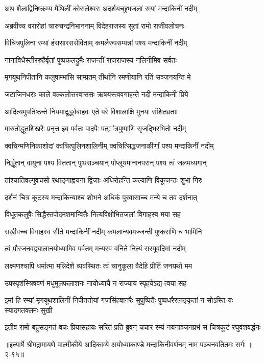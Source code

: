 
\twolineshloka
{अथ शैलाद्विनिष्क्रम्य मैथिलीं कोसलेश्वरः}
{अदर्शयच्छुभजलां रम्यां मन्दाकिनीं नदीम्} %

\twolineshloka
{अब्रवीच्च वरारोहां चारुचन्द्रनिभाननाम्}
{विदेहराजस्य सुतां रामो राजीवलोचनः} %

\twolineshloka
{विचित्रपुलिनां रम्यां हंससारससेविताम्}
{कमलैरुपसम्पन्नां पश्य मन्दाकिनीं नदीम्} %

\twolineshloka
{नानाविधैस्तीररुहैर्वृतां पुष्पफलद्रुमैः}
{राजन्तीं राजराजस्य नलिनीमिव सर्वतः} %

\twolineshloka
{मृगयूथनिपीतानि कलुषाम्भांसि साम्प्रतम्}
{तीर्थानि रमणीयानि रतिं सञ्जनयन्ति मे} %

\twolineshloka
{जटाजिनधराः काले वल्कलोत्तरवाससः}
{ऋषयस्त्ववगाहन्ते नदीं मन्दाकिनीं प्रिये} %

\twolineshloka
{आदित्यमुपतिष्ठन्ते नियमादूर्द्ध्वबाहवः}
{एते परे विशालाक्षि मुनयः संशितव्रताः} %

\twolineshloka
{मारुतोद्धूतशिखरैः प्रनृत्त इव पर्वतः}
{पादपैः पत्ऺत्रपुष्पाणि सृजद्भिरभितो नदीम्} %

\twolineshloka
{क्वचिन्मणिनिकाशोदां क्वचित्पुलिनशालिनीम्}
{क्वचित्सिद्धजनाकीर्णां पश्य मन्दाकिनीं नदीम्} %

\twolineshloka
{निर्द्धूतान् वायुना पश्य विततान् पुष्पसञ्चयान्}
{पोप्लूयमानानपरान् पश्य त्वं जलमध्यगान्} %

\twolineshloka
{तांश्चातिवल्गुवचसो रथाङ्गाह्वयना द्विजाः}
{अधिरोहन्ति कल्याणि विकूजन्तः शुभा गिरः} %

\twolineshloka
{दर्शनं चित्र कूटस्य मन्दाकिन्याश्च शोभने}
{अधिकं पुरवासाच्च मन्ये च तव दर्शनात्} %

\twolineshloka
{विधूतकलुषैः सिद्धैस्तपोदमशमान्वितैः}
{नित्यविक्षोभितजलां विगाहस्व मया सह} %

\twolineshloka
{सखीवच्च विगाहस्व सीते मन्दाकिनीं नदीम्}
{कमलान्यवमज्जन्ती पुष्कराणि च भामिनि} %

\twolineshloka
{त्वं पौरजनवद्व्यालानयोध्यामिव पर्वतम्}
{मन्यस्व वनिते नित्यं सरयूवदिमां नदीम्} %

\twolineshloka
{लक्ष्मणश्चापि धर्मात्मा मन्निदेशे व्यवस्थितः}
{त्वं चानुकूला वैदेहि प्रीतिं जनयथो मम} %

\twolineshloka
{उपस्पृशंस्त्रिषवणं मधुमूलफलाशनः}
{नायोध्यायै न राज्याय स्पृहयेऽद्य त्वया सह} %

\twolineshloka
{इमां हि रम्यां मृगयूथशालिनीं निपीततोयां गजसिंहवानरैः}
{सुपुष्पितैः पुष्पधरैरलङ्कृतां न सोऽस्ति यः स्यादगतक्लमः सुखी} %

\twolineshloka
{इतीव रामो बहुसङ्गतं वचः प्रियासहायः सरितं प्रति ब्रुवन्}
{चचार रम्यं नयनाञ्जनप्रभं स चित्रकूटं रघुवंशवर्द्धनः} %


॥इत्यार्षे श्रीमद्रामायणे वाल्मीकीये आदिकाव्ये अयोध्याकाण्डे मन्दाकिनीवर्णनम् नाम पञ्चनवतितमः सर्गः ॥२-९५॥
